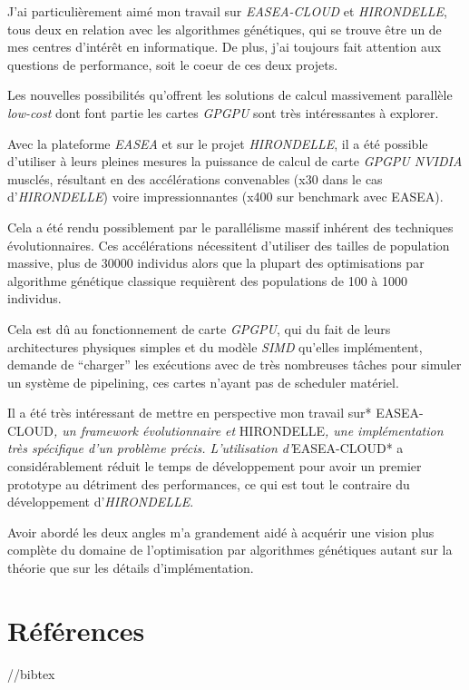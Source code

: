 \documentclass[french, 11pt]{memoir}
\begin{document}
J'ai particulièrement aimé mon travail sur \emph{EASEA-CLOUD} et
\emph{HIRONDELLE}, tous deux en relation avec les algorithmes
génétiques, qui se trouve être un de mes centres d'intérêt en
informatique. De plus, j'ai toujours fait attention aux questions de
performance, soit le coeur de ces deux projets.

Les nouvelles possibilités qu'offrent les solutions de calcul
massivement parallèle \emph{low-cost} dont font partie les cartes
\emph{GPGPU} sont très intéressantes à explorer.

Avec la plateforme \emph{EASEA} et sur le projet \emph{HIRONDELLE}, il a
été possible d'utiliser à leurs pleines mesures la puissance de calcul
de carte \emph{GPGPU NVIDIA} musclés, résultant en des accélérations
convenables (x30 dans le cas d'\emph{HIRONDELLE}) voire impressionnantes
(x400 sur benchmark avec EASEA).

Cela a été rendu possiblement par le parallélisme massif inhérent des
techniques évolutionnaires. Ces accélérations nécessitent d'utiliser des
tailles de population massive, plus de 30000 individus alors que la
plupart des optimisations par algorithme génétique classique requièrent
des populations de 100 à 1000 individus.

Cela est dû au fonctionnement de carte \emph{GPGPU}, qui du fait de
leurs architectures physiques simples et du modèle \emph{SIMD} qu'elles
implémentent, demande de ``charger'' les exécutions avec de très
nombreuses tâches pour simuler un système de pipelining, ces cartes
n'ayant pas de scheduler matériel.

Il a été très intéressant de mettre en perspective mon travail sur*
EASEA-CLOUD\emph{, un framework évolutionnaire et }HIRONDELLE\emph{, une
	implémentation très spécifique d'un problème précis. L'utilisation
	d'}EASEA-CLOUD* a considérablement réduit le temps de développement pour
avoir un premier prototype au détriment des performances, ce qui est
tout le contraire du développement d'\emph{HIRONDELLE}.

Avoir abordé les deux angles m'a grandement aidé à acquérir une vision
plus complète du domaine de l'optimisation par algorithmes génétiques
autant sur la théorie que sur les détails d'implémentation.

\section{Références}\label{ruxe9fuxe9rences}

//bibtex
\end{document}
